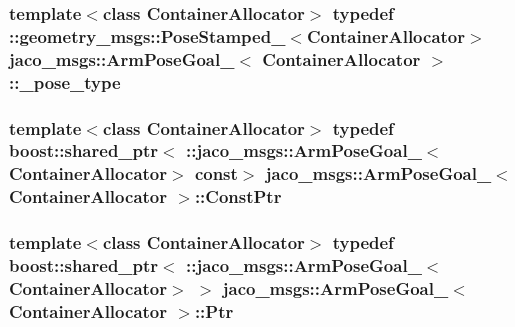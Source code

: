 \subsubsection[{\texorpdfstring{\+\_\+pose\+\_\+type}{_pose_type}}]{\setlength{\rightskip}{0pt plus 5cm}template$<$class Container\+Allocator$>$ typedef \+::geometry\+\_\+msgs\+::\+Pose\+Stamped\+\_\+$<$Container\+Allocator$>$ {\bf jaco\+\_\+msgs\+::\+Arm\+Pose\+Goal\+\_\+}$<$ Container\+Allocator $>$\+::{\bf \+\_\+pose\+\_\+type}}\hypertarget{structjaco__msgs_1_1ArmPoseGoal___a000eb0e79cdb7de7c51bac91709ffae0}{}\label{structjaco__msgs_1_1ArmPoseGoal___a000eb0e79cdb7de7c51bac91709ffae0}
\subsubsection[{\texorpdfstring{Const\+Ptr}{ConstPtr}}]{\setlength{\rightskip}{0pt plus 5cm}template$<$class Container\+Allocator$>$ typedef boost\+::shared\+\_\+ptr$<$ \+::{\bf jaco\+\_\+msgs\+::\+Arm\+Pose\+Goal\+\_\+}$<$Container\+Allocator$>$ const$>$ {\bf jaco\+\_\+msgs\+::\+Arm\+Pose\+Goal\+\_\+}$<$ Container\+Allocator $>$\+::{\bf Const\+Ptr}}\hypertarget{structjaco__msgs_1_1ArmPoseGoal___a54d5a329b1a740ee3922d9b43646d1ba}{}\label{structjaco__msgs_1_1ArmPoseGoal___a54d5a329b1a740ee3922d9b43646d1ba}
\subsubsection[{\texorpdfstring{Ptr}{Ptr}}]{\setlength{\rightskip}{0pt plus 5cm}template$<$class Container\+Allocator$>$ typedef boost\+::shared\+\_\+ptr$<$ \+::{\bf jaco\+\_\+msgs\+::\+Arm\+Pose\+Goal\+\_\+}$<$Container\+Allocator$>$ $>$ {\bf jaco\+\_\+msgs\+::\+Arm\+Pose\+Goal\+\_\+}$<$ Container\+Allocator $>$\+::{\bf Ptr}}\hypertarget{structjaco__msgs_1_1ArmPoseGoal___ad71d8fe47f303b9e2b8c0e8025424521}{}\label{structjaco__msgs_1_1ArmPoseGoal___ad71d8fe47f303b9e2b8c0e8025424521}
